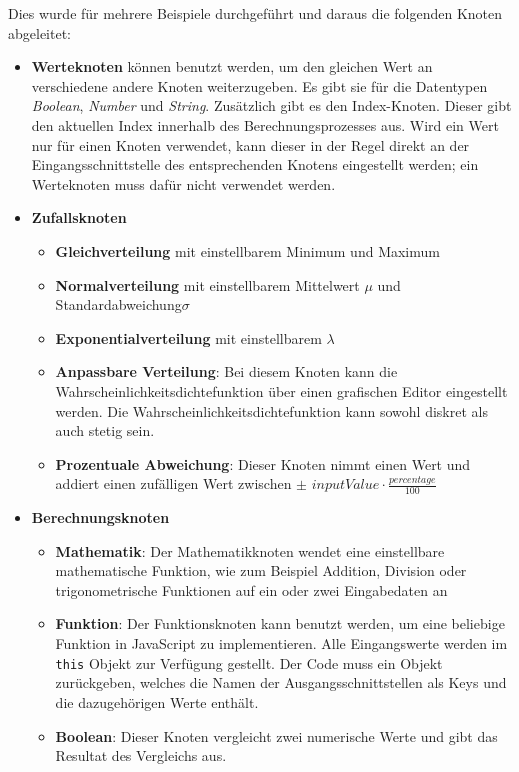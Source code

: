 Dies wurde für mehrere Beispiele durchgeführt und daraus die folgenden Knoten abgeleitet:
\begin{itemize}
    \item \textbf{Werteknoten} können benutzt werden, um den gleichen Wert an verschiedene andere Knoten weiterzugeben. Es gibt sie für die Datentypen \textit{Boolean}, \textit{Number} und \textit{String}. Zusätzlich gibt es den Index-Knoten. Dieser gibt den aktuellen Index innerhalb des Berechnungsprozesses aus. Wird ein Wert nur für einen Knoten verwendet, kann dieser in der Regel direkt an der Eingangsschnittstelle des entsprechenden Knotens eingestellt werden; ein Werteknoten muss dafür nicht verwendet werden.
    \item \textbf{Zufallsknoten}
    \begin{itemize}
        \item \textbf{Gleichverteilung} mit einstellbarem Minimum und Maximum
        \item \textbf{Normalverteilung} mit einstellbarem Mittelwert $\mu$ und Standardabweichung\nobreakspace $\sigma$
        \item \textbf{Exponentialverteilung} mit einstellbarem $\lambda$
        \item \textbf{Anpassbare Verteilung}: Bei diesem Knoten kann die Wahrscheinlichkeitsdichtefunktion über einen grafischen Editor eingestellt werden. Die Wahrscheinlichkeitsdichtefunktion kann sowohl diskret als auch stetig sein.
        \item \textbf{Prozentuale Abweichung}: Dieser Knoten nimmt einen Wert und addiert einen zufälligen Wert zwischen $\pm \, \, inputValue \cdot \frac{percentage}{100}$
    \end{itemize}
    \item \textbf{Berechnungsknoten}
    \begin{itemize}
        \item \textbf{Mathematik}: Der Mathematikknoten wendet eine einstellbare mathematische Funktion, wie zum Beispiel Addition, Division oder trigonometrische Funktionen auf ein oder zwei Eingabedaten an
        \item \textbf{Funktion}: Der Funktionsknoten kann benutzt werden, um eine beliebige Funktion in JavaScript zu implementieren. Alle Eingangswerte werden im \texttt{this} Objekt zur Verfügung gestellt. Der Code muss ein Objekt zurückgeben, welches die Namen der Ausgangsschnittstellen als Keys und die dazugehörigen Werte enthält.
        \item \textbf{Boolean}: Dieser Knoten vergleicht zwei numerische Werte und gibt das Resultat des Vergleichs aus.

\end{itemize}
\end{itemize}
